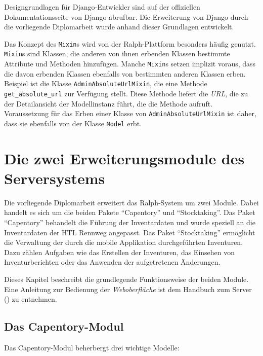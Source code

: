 Designgrundlagen für Django-Entwickler sind auf der offiziellen
Dokumentationsseite von Django \cite{django-doku-coding-style} abrufbar.
Die Erweiterung von Django durch die vorliegende Diplomarbeit wurde
anhand dieser Grundlagen entwickelt.

Das Konzept des \texttt{Mixin}s wird von der Ralph-Plattform besonders
häufig genutzt. \texttt{Mixin}s sind Klassen, die anderen von ihnen
erbenden Klassen bestimmte Attribute und Methoden hinzufügen. Manche
\texttt{Mixin}s setzen implizit voraus, dass die davon erbenden Klassen
ebenfalls von bestimmten anderen Klassen erben. Beispiel ist die Klasse
\texttt{AdminAbsoluteUrlMixin}, die eine Methode
\texttt{get\_absolute\_url} zur Verfügung stellt. Diese Methode liefert
die \emph{URL}, die zu
der Detailansicht der Modellinstanz führt, die die Methode aufruft.
Voraussetzung für das Erben einer Klasse von
\texttt{AdminAbsoluteUrlMixin} ist daher, dass sie ebenfalls von der
Klasse \texttt{Model} erbt.

\chapter{Die zwei Erweiterungsmodule des Serversystems}
\label{die_zwei_module}

Die vorliegende Diplomarbeit erweitert das Ralph-System um zwei Module.
Dabei handelt es sich um die beiden Pakete ``Capentory'' und
``Stocktaking''. Das Paket ``Capentory'' behandelt die Führung der
Inventardaten und wurde speziell an die Inventardaten der HTL Rennweg
angepasst. Das Paket ``Stocktaking'' ermöglicht die Verwaltung der durch
die mobile Applikation durchgeführten Inventuren. Dazu zählen Aufgaben
wie das Erstellen der Inventuren, das Einsehen von Inventurberichten
oder das Anwenden der aufgetretenen Änderungen.

Dieses Kapitel beschreibt die grundlegende Funktionsweise der beiden
Module. Eine Anleitung zur Bedienung der \emph{Weboberfläche}
ist dem Handbuch zum Server () zu entnehmen.

\hypertarget{das-capentory-modul}{%
\section{Das Capentory-Modul}\label{das-capentory-modul}}

Das Capentory-Modul beherbergt drei wichtige Modelle:

